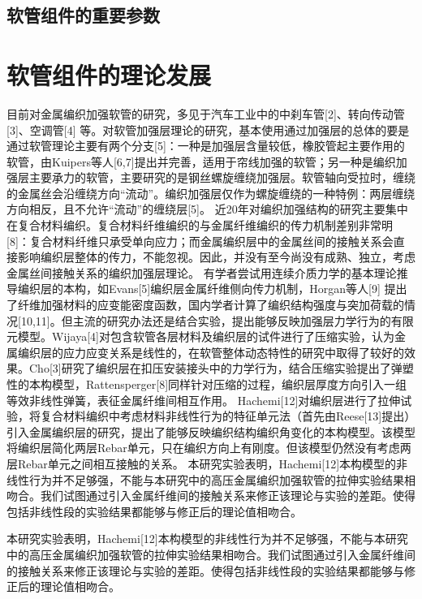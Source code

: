 \subsection{软管组件的重要参数}

\section{软管组件的理论发展}


目前对金属编织加强软管的研究，多见于汽车工业中的中刹车管[2]、转向传动管[3]、空调管[4] 等。对软管加强层理论的研究，基本使用通过加强层的总体的要是通过软管理论主要有两个分支[5]：一种是加强层含量较低，橡胶管起主要作用的软管，由Kuipers等人[6,7]提出并完善，适用于帘线加强的软管；另一种是编织加强层主要承力的软管，主要研究的是钢丝螺旋缠绕加强层。软管轴向受拉时，缠绕的金属丝会沿缠绕方向“流动”。编织加强层仅作为螺旋缠绕的一种特例：两层缠绕方向相反，且不允许“流动”的缠绕层[5]。
近20年对编织加强结构的研究主要集中在复合材料编织。复合材料纤维编织的与金属纤维编织的传力机制差别非常明[8]：复合材料纤维只承受单向应力；而金属编织层中的金属丝间的接触关系会直接影响编织层整体的传力，不能忽视。因此，并没有至今尚没有成熟、独立，考虑金属丝间接触关系的编织加强层理论。
有学者尝试用连续介质力学的基本理论推导编织层的本构，如Evans[5]编织层金属纤维侧向传力机制，Horgan等人[9] 提出了纤维加强材料的应变能密度函数，国内学者计算了编织结构强度与突加荷载的情况[10,11]。但主流的研究办法还是结合实验，提出能够反映加强层力学行为的有限元模型。Wijaya[4]对包含软管各层材料及编织层的试件进行了压缩实验，认为金属编织层的应力应变关系是线性的，在软管整体动态特性的研究中取得了较好的效果。Cho[3]研究了编织层在扣压安装接头中的力学行为，结合压缩实验提出了弹塑性的本构模型，Rattensperger[8]同样针对压缩的过程，编织层厚度方向引入一组等效非线性弹簧，表征金属纤维间相互作用。
Hachemi[12]对编织层进行了拉伸试验，将复合材料编织中考虑材料非线性行为的特征单元法（首先由Reese[13]提出）引入金属编织层的研究，提出了能够反映编织结构编织角变化的本构模型。该模型将编织层简化两层Rebar单元，只在编织方向上有刚度。但该模型仍然没有考虑两层Rebar单元之间相互接触的关系。
本研究实验表明，Hachemi[12]本构模型的非线性行为并不足够强，不能与本研究中的高压金属编织加强软管的拉伸实验结果相吻合。我们试图通过引入金属纤维间的接触关系来修正该理论与实验的差距。使得包括非线性段的实验结果都能够与修正后的理论值相吻合。

本研究实验表明，Hachemi[12]本构模型的非线性行为并不足够强，不能与本研究中的高压金属编织加强软管的拉伸实验结果相吻合。我们试图通过引入金属纤维间的接触关系来修正该理论与实验的差距。使得包括非线性段的实验结果都能够与修正后的理论值相吻合。

